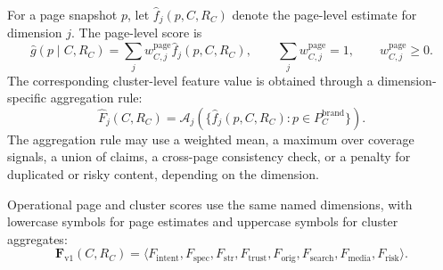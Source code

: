 \documentclass{article}
\begin{document}
For a page snapshot \(p\), let \(\hat{f}_j(p,C,R_C)\) denote the page-level estimate for dimension \(j\). The page-level score is
\[
\hat{g}(p \mid C,R_C)
=
\sum_j w^{\text{page}}_{C,j}\hat{f}_j(p,C,R_C),
\qquad
\sum_j w^{\text{page}}_{C,j}=1,
\qquad
w^{\text{page}}_{C,j}\ge 0.
\]
The corresponding cluster-level feature value is obtained through a dimension-specific aggregation rule:
\[
\hat{F}_j(C,R_C)
=
\mathcal{A}_j
\left(
\{\hat{f}_j(p,C,R_C):p\in P_C^{\text{brand}}\}
\right).
\]
The aggregation rule may use a weighted mean, a maximum over coverage signals, a union of claims, a cross-page consistency check, or a penalty for duplicated or risky content, depending on the dimension.

Operational page and cluster scores use the same named dimensions, with lowercase symbols for page estimates and uppercase symbols for cluster aggregates:
\[
\mathbf{F}_{\text{v1}}(C,R_C)
=
\langle
F_{\text{intent}},
F_{\text{spec}},
F_{\text{str}},
F_{\text{trust}},
F_{\text{orig}},
F_{\text{search}},
F_{\text{media}},
F_{\text{risk}}
\rangle.
\]
\end{document}

